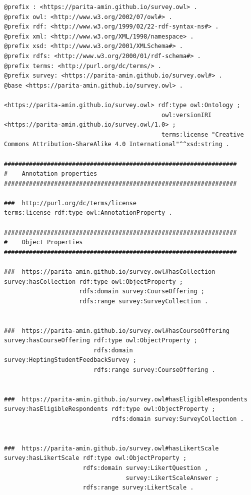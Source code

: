 \begin{lstlisting}
@prefix : <https://parita-amin.github.io/survey.owl> .
@prefix owl: <http://www.w3.org/2002/07/owl#> .
@prefix rdf: <http://www.w3.org/1999/02/22-rdf-syntax-ns#> .
@prefix xml: <http://www.w3.org/XML/1998/namespace> .
@prefix xsd: <http://www.w3.org/2001/XMLSchema#> .
@prefix rdfs: <http://www.w3.org/2000/01/rdf-schema#> .
@prefix terms: <http://purl.org/dc/terms/> .
@prefix survey: <https://parita-amin.github.io/survey.owl#> .
@base <https://parita-amin.github.io/survey.owl> .

<https://parita-amin.github.io/survey.owl> rdf:type owl:Ontology ;
                                            owl:versionIRI <https://parita-amin.github.io/survey.owl/1.0> ;
                                            terms:license "Creative Commons Attribution-ShareAlike 4.0 International"^^xsd:string .
                               
#################################################################
#    Annotation properties
#################################################################

###  http://purl.org/dc/terms/license
terms:license rdf:type owl:AnnotationProperty .

#################################################################
#    Object Properties
#################################################################

###  https://parita-amin.github.io/survey.owl#hasCollection
survey:hasCollection rdf:type owl:ObjectProperty ;
                     rdfs:domain survey:CourseOffering ;
                     rdfs:range survey:SurveyCollection .


###  https://parita-amin.github.io/survey.owl#hasCourseOffering
survey:hasCourseOffering rdf:type owl:ObjectProperty ;
                         rdfs:domain survey:HeptingStudentFeedbackSurvey ;
                         rdfs:range survey:CourseOffering .


###  https://parita-amin.github.io/survey.owl#hasEligibleRespondents
survey:hasEligibleRespondents rdf:type owl:ObjectProperty ;
                              rdfs:domain survey:SurveyCollection .


###  https://parita-amin.github.io/survey.owl#hasLikertScale
survey:hasLikertScale rdf:type owl:ObjectProperty ;
                      rdfs:domain survey:LikertQuestion ,
                                  survey:LikertScaleAnswer ;
                      rdfs:range survey:LikertScale .



\end{lstlisting}
